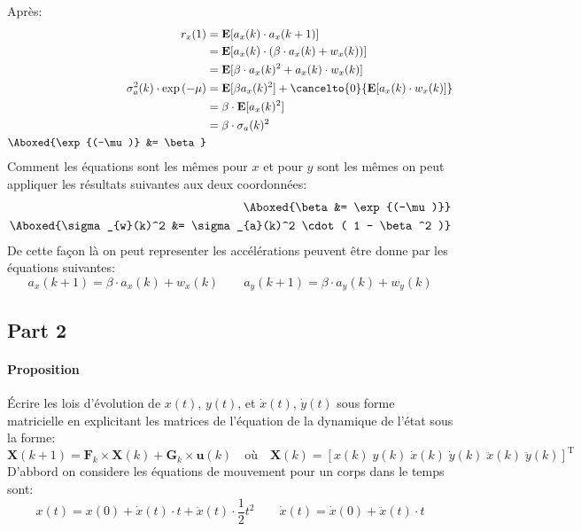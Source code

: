 \documentclass{article}
\begin{document}
Après:
\begin{align*}
    r_{x}(1) &= \mathbf{E}[a_{x}(k) \cdot a_{x}(k+1)]\\
    &= \mathbf{E}[a_{x}(k) \cdot (\beta \cdot a_{x}(k) + w_{x}(k))]\\
    &= \mathbf{E}[\beta \cdot a_{x}(k)^{2} + a_{x}(k) \cdot w_{x}(k)]\\
    \sigma_{a}^{2}(k) \cdot \exp{(-\mu)} &= \mathbf{E}[\beta a_{x}(k)^{2}] + \cancelto{0}{\mathbf{E}[a_{x}(k) \cdot w_{x}(k)]}\\
    &= \beta \cdot \mathbf{E}[a_{x}(k)^{2}]\\
    &= \beta \cdot \sigma_{a}(k)^2\\
    \Aboxed{\exp{(-\mu)} &= \beta}
\end{align*}
Comment les équations sont les mêmes pour $x$ et pour $y$ sont les mêmes on peut appliquer les résultats suivantes aux deux coordonnées:
\begin{align}
    \Aboxed{\beta &= \exp{(-\mu)}}\\
    \Aboxed{\sigma_{w}(k)^2 &= \sigma_{a}(k)^2 \cdot ( 1 - \beta^2 )}
\end{align}
De cette façon là on peut representer les accélérations peuvent être donne par les équations suivantes:
\begin{equation}
    \boxed{a_{x}(k+1) = \beta \cdot a_{x}(k) + w_{x}(k)}
    \qquad
    \boxed{a_{y}(k+1) = \beta \cdot a_{y}(k) + w_{y}(k)}
\end{equation}

\subsection{Part 2}
\paragraph{Proposition}Écrire les lois d'évolution de $x(t)$, $y(t)$, et $\dot{x}(t)$, $\dot{y}(t)$ sous forme matricielle en explicitant les matrices de l'équation de la dynamique de l'état sous la forme:
\begin{equation}
    \mathbf{X}(k+1) = \mathbf{F}_{k} \times \mathbf{X}(k) + \mathbf{G}_{k} \times \mathbf{u}(k)
    \quad
    \text{où}
    \quad
    \mathbf{X}(k) = [x(k)\;y(k)\;\dot{x}(k)\;\dot{y}(k)\;\ddot{x}(k)\;\ddot{y}(k)]^{\text{T}}
\end{equation}
D'abbord on considere les équations de mouvement pour un corps dans le temps sont:
\begin{equation*}
    x(t) = x(0) + \dot{x}(t) \cdot t + \ddot{x}(t) \cdot \frac{1}{2}t^2
    \qquad
    \dot{x}(t) = \dot{x}(0) + \ddot{x}(t) \cdot t
\end{equation*}
\end{document}
